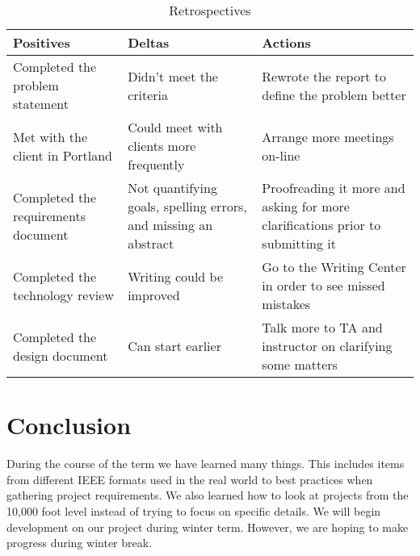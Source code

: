 \documentclass[journal,compsoc, 10pt, draftclsnofoot, onecolumn]{IEEEtran}
\begin{document}
\begin{table}[!h]
\centering
\caption{Retrospectives}
\label{my-label}
\begin{tabularx}{\textwidth}{X|X|X}
\hline
\textbf{Positives} & \textbf{Deltas} & \textbf{Actions} \\ \hline
Completed the problem statement                  &  Didn't meet the criteria                &Rewrote the report to define the problem better                 \\ \hline
Met with the client in Portland                  &     Could meet with clients more frequently            & Arrange more meetings on-line                 \\ \hline
Completed the requirements document                  & Not quantifying goals, spelling errors, and missing an abstract                & Proofreading it more and asking for more clarifications prior to submitting it                 \\ \hline
Completed the technology review                 & Writing could be improved                & Go to the Writing Center in order to see missed mistakes                 \\ \hline
Completed the design document                  & Can start earlier                 &Talk more to TA and instructor on clarifying some matters                  \\ \hline
\end{tabularx}
\end{table}

\FloatBarrier
\section{Conclusion}
During the course of the term we have learned many things. This includes items 
from different IEEE formats used in the real world to best practices when gathering 
project requirements. We also learned how to look at projects from the 10,000 
foot level instead of trying to focus on specific details. We will begin development 
on our project during winter term. However, we are hoping to make progress 
during winter break. 
\end{document}
